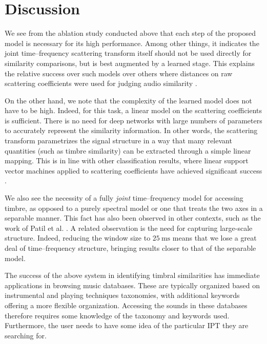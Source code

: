 \documentclass{bmcart}
\newcommand{\nmu}{}
\begin{document}
\section*{\nmu Discussion}
\label{sec:discussion}

We see from the ablation study conducted above that each step of the proposed model is necessary for its high performance.
Among other things, it indicates the joint time--frequency scattering transform itself should not be used directly for similarity comparisons, but is best augmented by a learned stage.
This explains the relative success over such models \cite{lostanlen2018jasmp,lostanlen2018extended} over others where distances on raw scattering coefficients were used for judging audio similarity \cite{bauge2013representing}.

On the other hand, we note that the complexity of the learned model does not have to be high.
Indeed, for this task, a linear model on the scattering coefficients is sufficient.
There is no need for deep networks with large numbers of parameters to accurately represent the similarity information.
In other words, the scattering transform parametrizes the signal structure in a way that many relevant quantities (such as timbre similarity) can be extracted through a simple linear mapping.
This is in line with other classification results, where linear support vector machines applied to scattering coefficients have achieved significant success \cite{anden2015mlsp,anden2019tsp}.

We also see the necessity of a fully \emph{joint} time--frequency model for accessing timbre, as opposed to a purely spectral model or one that treats the two axes in a separable manner.
This fact has also been observed in other contexts, such as the work of Patil et al. \cite{patil2012ploscompbiol}.
A related observation is the need for capturing large-scale structure.
Indeed, reducing the window size to $25~\mathrm{ms}$ means that we lose a great deal of time--frequency structure, bringing results closer to that of the separable model.

The success of the above system in identifying timbral similarities has immediate applications in browsing music databases.
These are typically organized based on instrumental and playing techniques taxonomies, with additional keywords offering a more flexible organization.
Accessing the sounds in these databases therefore requires some knowledge of the taxonomy and keywords used.
Furthermore, the user needs to have some idea of the particular IPT they are searching for.
\end{document}
